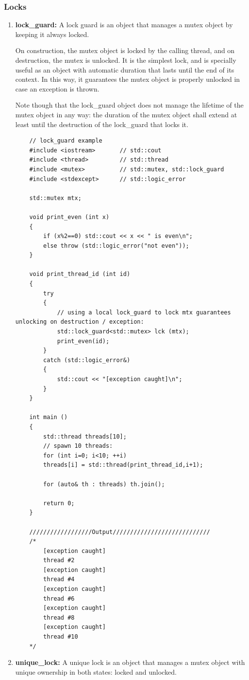 \documentclass[UTF8,a4paper,12pt]{ctexbook}
\begin{document}
		\subsubsection{Locks}
			\begin{enumerate}[itemindent = 1em]
				\item \textbf{lock\_guard:}
					A lock guard is an object that manages a mutex object by keeping it always locked.
					
					On construction, the mutex object is locked by the calling thread, and on destruction, the mutex is unlocked. It is the simplest lock, and is specially useful as an object with automatic duration that lasts until the end of its context. In this way, it guarantees the mutex object is properly unlocked in case an exception is thrown.
					
					Note though that the lock\_guard object does not manage the lifetime of the mutex object in any way: the duration of the mutex object shall extend at least until the destruction of the lock\_guard that locks it.
\begin{lstlisting}
	// lock_guard example
	#include <iostream>       // std::cout
	#include <thread>         // std::thread
	#include <mutex>          // std::mutex, std::lock_guard
	#include <stdexcept>      // std::logic_error
	
	std::mutex mtx;
	
	void print_even (int x) 
	{
		if (x%2==0) std::cout << x << " is even\n";
		else throw (std::logic_error("not even"));
	}
	
	void print_thread_id (int id) 
	{
		try 
		{
			// using a local lock_guard to lock mtx guarantees unlocking on destruction / exception:
			std::lock_guard<std::mutex> lck (mtx);
			print_even(id);
		}
		catch (std::logic_error&) 
		{
			std::cout << "[exception caught]\n";
		}
	}
	
	int main ()
	{
		std::thread threads[10];
		// spawn 10 threads:
		for (int i=0; i<10; ++i)
		threads[i] = std::thread(print_thread_id,i+1);
		
		for (auto& th : threads) th.join();
		
		return 0;
	}
	
	//////////////////Output////////////////////////////
	/*
		[exception caught]
		thread #2
		[exception caught]
		thread #4
		[exception caught]
		thread #6
		[exception caught]
		thread #8
		[exception caught]
		thread #10
	*/
\end{lstlisting}					
				\item \textbf{unique\_lock:}
					A unique lock is an object that manages a mutex object with unique ownership in both states: locked and unlocked.
					

\end{enumerate}
\end{document}
